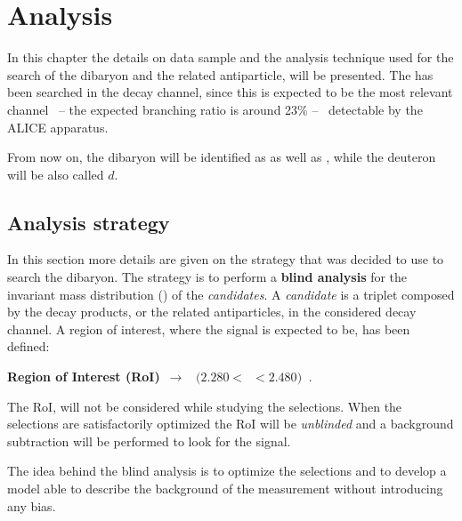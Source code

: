 %
\chapter{Analysis}
\label{sec:4}


In this chapter the details on data sample and the analysis technique used for the search of the \dst
dibaryon and the related antiparticle, will be presented. 
The \dst has been searched in the \dstdecay decay channel, since this is expected to be the
most relevant channel \ -- the expected branching ratio is around 23\% -- \ detectable by the
ALICE apparatus.

From now on, the \dst dibaryon will be identified as \ds as well as \dst, while the deuteron
will be also called $d$.

%
%
\section{Analysis strategy} \label{sec:4.1}

In this section more details are given on the strategy that was decided to use to search the
\dst dibaryon. 
The strategy is to perform a \textbf{blind analysis} for the invariant mass distribution
(\minv) of the \dst \textit{candidates}. A \ds \textit{candidate} is a triplet composed 
by the \ds decay products, or the related antiparticles, in the considered decay channel.
A region of interest, where the \ds signal is expected to be, has been defined:
\begin{center}
\textbf{Region of Interest (RoI)}\  $\rightarrow$ \  $(2.280  < $\ \minv$  < 2.480)\ $ \gevcs.
\end{center}
The RoI, will not be considered while studying the selections.
When the selections are satisfactorily optimized the RoI will be \textit{unblinded} and a
background subtraction will be performed to look for the signal.

The idea behind the blind analysis is to optimize the selections and to develop a model
able to describe the background of the measurement without introducing any bias. 

